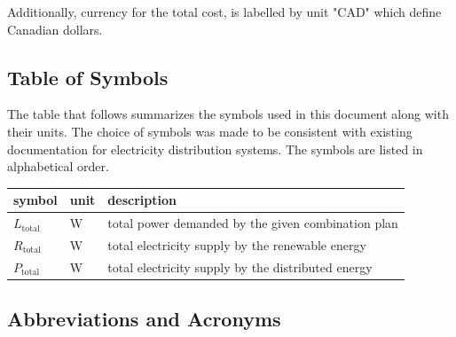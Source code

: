\documentclass[12pt]{article}
\begin{document}
\bigskip
Additionally, currency for the total cost, is labelled by unit "CAD" which define Canadian dollars.
\\

\subsection{Table of Symbols}

The table that follows summarizes the symbols used in this document along with their units. The choice of symbols was made to be consistent with existing documentation for electricity distribution systems.  The symbols are listed in alphabetical order.

\renewcommand{\arraystretch}{1.2}
\noindent \begin{longtable*}{l l p{12cm}} \toprule
\textbf{symbol} & \textbf{unit} & \textbf{description}\\
\midrule 

$L_\text{total}$ & \si[per-mode=symbol] {\watt} &total power demanded by the given combination plan
\\ 
$R_\text{total}$ & \si[per-mode=symbol] {\watt} &total electricity supply by the renewable energy\\
$P_\text{total}$ & \si[per-mode=symbol] {\watt} &total electricity supply by the distributed energy\\
\bottomrule
\end{longtable*}

\subsection{Abbreviations and Acronyms}
\end{document}
